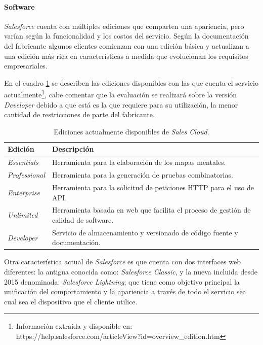 \paragraph{Software}
\emph{Salesforce} cuenta con múltiples ediciones que comparten una apariencia,
pero varían según la funcionalidad y los costos del servicio. Según la
documentación del fabricante algunos clientes comienzan con una edición básica y
actualizan a una edición más rica en características a medida que evolucionan
los requisitos empresariales.

En el cuadro \ref{ediciones} se describen las ediciones disponibles con las que
cuenta el servicio actualmente\footnote{Información extraída y disponible en:
https://help.salesforce.com/articleView?id=overview\_edition.htm}, cabe comentar
que la evaluación se realizará sobre la versión \emph{Developer} debido a que
está es la que requiere para su utilización, la menor cantidad de restricciones
de parte del fabricante.

\begin{table}
\centering
\begin{tabular}{|l|p{12.0cm}|}
\hline
\footnotesize{\textbf{Edición}} & \footnotesize{\textbf{Descripción}} \\
\hline
\footnotesize{\emph{Essentials}} & \footnotesize{Herramienta para la elaboración de los mapas mentales.} \\
\footnotesize{\emph{Professional}} & \footnotesize{Herramienta para la generación de pruebas combinatorias.} \\
\footnotesize{\emph{Enterprise}} & \footnotesize{Herramienta para la solicitud de peticiones HTTP para el uso de API.} \\
\footnotesize{\emph{Unlimited}} & \footnotesize{Herramienta basada en web que facilita el proceso de gestión de calidad de software.} \\
\footnotesize{\emph{Developer}} & \footnotesize{Servicio de almacenamiento y versionado de código fuente y documentación.} \\
\hline
\end{tabular}
\caption{Ediciones actualmente disponibles de \emph{Sales Cloud}.}
\label{ediciones}
\end{table}

Otra característica actual de \emph{Salesforce} es que cuenta con dos interfaces
web diferentes: la antigua conocida como: \emph{Salesforce Classic}, y la nueva
incluida desde 2015 denominada: \emph{Salesforce Lightning}; que tiene como
objetivo principal la unificación del comportamiento y la apariencia a través de
todo el servicio sea cual sea el dispositivo que el cliente
utilice\cite{McCarthy}.

